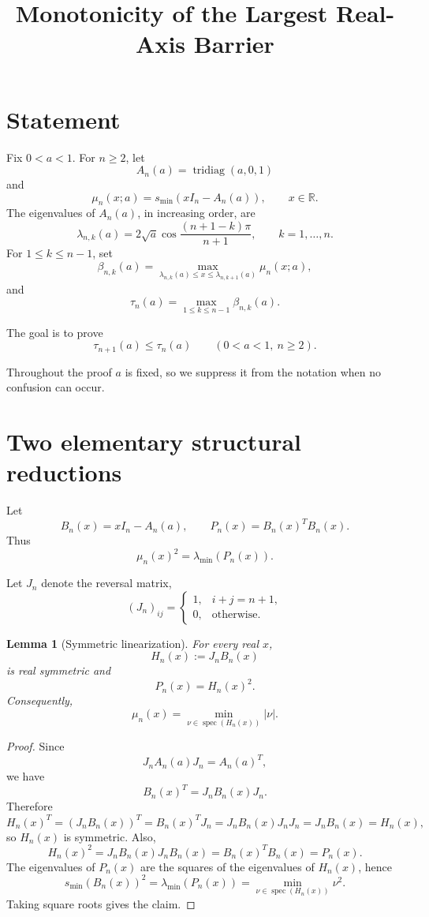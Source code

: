 \documentclass[11pt]{amsart}
\title{Monotonicity of the Largest Real-Axis Barrier}
\author{}
\date{}
\numberwithin{equation}{section}
\newtheorem{lemma}[theorem]{Lemma}
\DeclareMathOperator{\tridiag}{tridiag}
\DeclareMathOperator{\spec}{spec}
\begin{document}
\maketitle

\section{Statement}

Fix \(0<a<1\).  For \(n\ge2\), let
\[
        A_n(a)=\tridiag(a,0,1)
\]
and
\[
        \mu_n(x;a)=s_{\min}(xI_n-A_n(a)),
        \qquad x\in\mathbb R .
\]
The eigenvalues of \(A_n(a)\), in increasing order, are
\[
        \lambda_{n,k}(a)
        =
        2\sqrt a\cos\frac{(n+1-k)\pi}{n+1},
        \qquad k=1,\dots,n.
\]
For \(1\le k\le n-1\), set
\[
        \beta_{n,k}(a)
        =
        \max_{\lambda_{n,k}(a)\le x\le \lambda_{n,k+1}(a)}
        \mu_n(x;a),
\]
and
\[
        \tau_n(a)=\max_{1\le k\le n-1}\beta_{n,k}(a).
\]

The goal is to prove
\[
        \boxed{\tau_{n+1}(a)\le \tau_n(a)}
        \qquad(0<a<1,\ n\ge2).
\]

Throughout the proof \(a\) is fixed, so we suppress it from the notation when
no confusion can occur.

\section{Two elementary structural reductions}

Let
\[
        B_n(x)=xI_n-A_n(a),
        \qquad
        P_n(x)=B_n(x)^TB_n(x).
\]
Thus
\[
        \mu_n(x)^2=\lambda_{\min}(P_n(x)).
\]

Let \(J_n\) denote the reversal matrix,
\[
        (J_n)_{ij}=
        \begin{cases}
        1, & i+j=n+1,\\
        0, & \text{otherwise}.
        \end{cases}
\]

\begin{lemma}[Symmetric linearization]\label{lem:symmetric-linearization}
For every real \(x\),
\[
        H_n(x):=J_nB_n(x)
\]
is real symmetric and
\[
        P_n(x)=H_n(x)^2.
\]
Consequently,
\[
        \mu_n(x)
        =
        \min_{\nu\in\spec(H_n(x))}|\nu|.
\]
\end{lemma}

\begin{proof}
Since
\[
        J_nA_n(a)J_n=A_n(a)^T,
\]
we have
\[
        B_n(x)^T=J_nB_n(x)J_n.
\]
Therefore
\[
        H_n(x)^T
        =
        (J_nB_n(x))^T
        =
        B_n(x)^TJ_n
        =
        J_nB_n(x)J_nJ_n
        =
        J_nB_n(x)
        =
        H_n(x),
\]
so \(H_n(x)\) is symmetric.  Also,
\[
        H_n(x)^2
        =
        J_nB_n(x)J_nB_n(x)
        =
        B_n(x)^TB_n(x)
        =
        P_n(x).
\]
The eigenvalues of \(P_n(x)\) are the squares of the eigenvalues of
\(H_n(x)\), hence
\[
        s_{\min}(B_n(x))^2
        =
        \lambda_{\min}(P_n(x))
        =
        \min_{\nu\in\spec(H_n(x))}\nu^2.
\]
Taking square roots gives the claim.
\end{proof}
\end{document}
